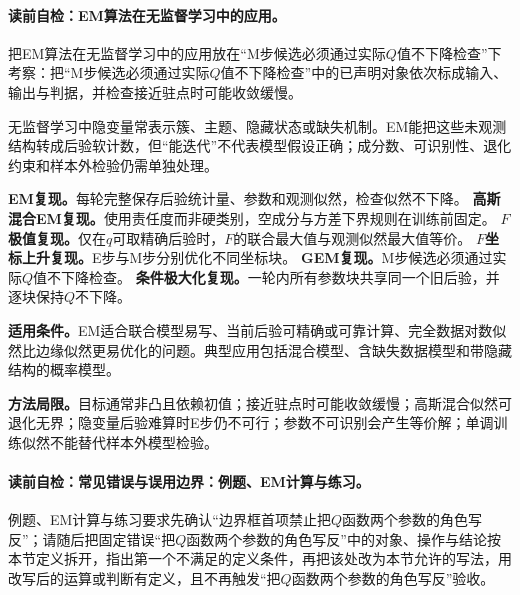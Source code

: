 \paragraph{读前自检：EM算法在无监督学习中的应用。}把EM算法在无监督学习中的应用放在“M步候选必须通过实际$Q$值不下降检查”下考察：把“M步候选必须通过实际$Q$值不下降检查”中的已声明对象依次标成输入、输出与判据，并检查接近驻点时可能收敛缓慢。\par

无监督学习中隐变量常表示簇、主题、隐藏状态或缺失机制。EM能把这些未观测结构转成后验软计数，但“能迭代”不代表模型假设正确；成分数、可识别性、退化约束和样本外检验仍需单独处理。

\label{replay:V3-C04-S07-SLM-09-01-004}
\textbf{EM复现。}每轮完整保存后验统计量、参数和观测似然，检查似然不下降。
\label{replay:V3-C04-S07-SLM-09-02-004}
\textbf{高斯混合EM复现。}使用责任度而非硬类别，空成分与方差下界规则在训练前固定。
\label{replay:V3-C04-S07-SLM-09-03-005}
\textbf{$F$极值复现。}仅在$q$可取精确后验时，$F$的联合最大值与观测似然最大值等价。
\label{replay:V3-C04-S07-SLM-09-03-006}
\textbf{$F$坐标上升复现。}E步与M步分别优化不同坐标块。
\label{replay:V3-C04-S07-SLM-09-04-005}
\textbf{GEM复现。}M步候选必须通过实际$Q$值不下降检查。
\label{replay:V3-C04-S07-SLM-09-05-001}
\textbf{条件极大化复现。}一轮内所有参数块共享同一个旧后验，并逐块保持$Q$不下降。

\label{struct:V3-C04-CH28}
\label{struct:V3-C04-CH29}
\begin{applicabilitybox}
\textbf{适用条件。}EM适合联合模型易写、当前后验可精确或可靠计算、完全数据对数似然比边缘似然更易优化的问题。典型应用包括混合模型、含缺失数据模型和带隐藏结构的概率模型。

\textbf{方法局限。}目标通常非凸且依赖初值；接近驻点时可能收敛缓慢；高斯混合似然可退化无界；隐变量后验难算时E步仍不可行；参数不可识别会产生等价解；单调训练似然不能替代样本外模型检验。
\end{applicabilitybox}

\label{struct:V3-C04-CH30}
\paragraph{读前自检：常见错误与误用边界：例题、EM计算与练习。}例题、EM计算与练习要求先确认“边界框首项禁止把$Q$函数两个参数的角色写反”；请随后把固定错误“把$Q$函数两个参数的角色写反”中的对象、操作与结论按本节定义拆开，指出第一个不满足的定义条件，再把该处改为本节允许的写法，用改写后的运算或判断有定义，且不再触发“把$Q$函数两个参数的角色写反”验收。\par

